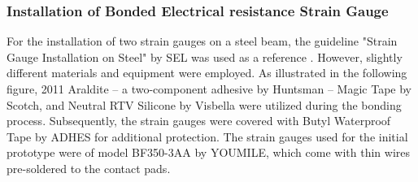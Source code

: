 \subsubsection{Installation of Bonded Electrical resistance Strain Gauge}
For the installation of two strain gauges on a steel beam, the guideline "Strain Gauge Installation on Steel" \cite[see][]{Brown:2016} by SEL was used as a reference . However, slightly different materials and equipment were employed. As illustrated in the following figure, 2011 Araldite – a two-component adhesive by Huntsman – Magic Tape by Scotch, and Neutral RTV Silicone by Visbella were utilized during the bonding process. Subsequently, the strain gauges were covered with Butyl Waterproof Tape by ADHES for additional protection.
The strain gauges used for the initial prototype were of model BF350-3AA by YOUMILE, which come with thin wires pre-soldered to the contact pads. 



